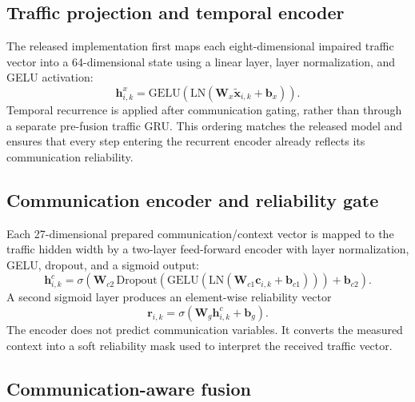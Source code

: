 \documentclass[pdflatex,sn-mathphys-num]{sn-jnl}%
\newenvironment{changed}{\color{blue}}{}
\theoremstyle{thmstyleone}%
\theoremstyle{thmstyletwo}%
\theoremstyle{thmstylethree}%
\begin{document}
\begin{changed}
\subsection{Traffic projection and temporal encoder}
\label{subsec:traffic_temporal_encoder}

The released implementation first maps each eight-dimensional impaired traffic vector into a 64-dimensional state using a linear layer, layer normalization, and GELU activation:
\begin{equation}
\mathbf{h}^{x}_{i,k}=\mathrm{GELU}\!\left(\mathrm{LN}\!\left(\mathbf{W}_{x}\widetilde{\mathbf{x}}_{i,k}+\mathbf{b}_{x}\right)\right).
\end{equation}
Temporal recurrence is applied after communication gating, rather than through a separate pre-fusion traffic GRU. This ordering matches the released model and ensures that every step entering the recurrent encoder already reflects its communication reliability.

\subsection{Communication encoder and reliability gate}
\label{subsec:communication_encoder}

Each 27-dimensional prepared communication/context vector is mapped to the traffic hidden width by a two-layer feed-forward encoder with layer normalization, GELU, dropout, and a sigmoid output:
\begin{equation}
\mathbf{h}^{c}_{i,k}=\sigma\!\left(\mathbf{W}_{c2}\,\mathrm{Dropout}\!\left(\mathrm{GELU}\!\left(\mathrm{LN}\!\left(\mathbf{W}_{c1}\mathbf{c}_{i,k}+\mathbf{b}_{c1}\right)\right)\right)+\mathbf{b}_{c2}\right).
\end{equation}
A second sigmoid layer produces an element-wise reliability vector
\begin{equation}
\mathbf{r}_{i,k}=\sigma\!\left(\mathbf{W}_{g}\mathbf{h}^{c}_{i,k}+\mathbf{b}_{g}\right).
\end{equation}
The encoder does not predict communication variables. It converts the measured context into a soft reliability mask used to interpret the received traffic vector.

\subsection{Communication-aware fusion}
\label{subsec:communication_fusion}


\end{changed}
\end{document}
